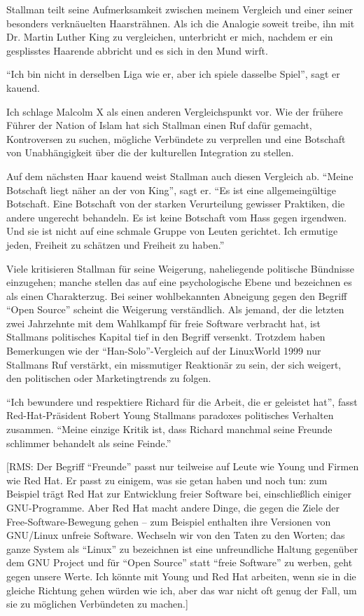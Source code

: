 Stallman teilt seine Aufmerksamkeit zwischen meinem Vergleich und einer seiner besonders verknäuelten Haarsträhnen. Als ich die Analogie soweit treibe, ihn mit Dr. Martin Luther King zu vergleichen, unterbricht er mich, nachdem er ein gesplisstes Haarende abbricht und es sich in den Mund wirft.

"`Ich bin nicht in derselben Liga wie er, aber ich spiele dasselbe Spiel"', sagt er kauend.

Ich schlage Malcolm X als einen anderen Vergleichspunkt vor. Wie der frühere Führer der Nation of Islam hat sich Stallman einen Ruf dafür gemacht, Kontroversen zu suchen, mögliche Verbündete zu verprellen und eine Botschaft von Unabhängigkeit über die der kulturellen Integration zu stellen.

Auf dem nächsten Haar kauend weist Stallman auch diesen Vergleich ab. "`Meine Botschaft liegt näher an der von King"', sagt er. "`Es ist eine allgemeingültige Botschaft. Eine Botschaft von der starken Verurteilung gewisser Praktiken, die andere ungerecht behandeln. Es ist keine Botschaft vom Hass gegen irgendwen. Und sie ist nicht auf eine schmale Gruppe von Leuten gerichtet. Ich ermutige jeden, Freiheit zu schätzen und Freiheit zu haben."'

Viele kritisieren Stallman für seine Weigerung, naheliegende politische Bündnisse einzugehen; manche stellen das auf eine psychologische Ebene und bezeichnen es als einen Charakterzug. Bei seiner wohlbekannten Abneigung gegen den Begriff "`Open Source"' scheint die Weigerung verständlich. Als jemand, der die letzten zwei Jahrzehnte mit dem Wahlkampf für freie Software verbracht hat, ist Stallmans politisches Kapital tief in den Begriff versenkt. Trotzdem haben Bemerkungen wie der "`Han-Solo"'-Vergleich auf der LinuxWorld 1999 nur Stallmans Ruf verstärkt, ein missmutiger Reaktionär zu sein, der sich weigert, den politischen oder Marketingtrends zu folgen.

"`Ich bewundere und respektiere Richard für die Arbeit, die er geleistet hat"', fasst Red-Hat-Präsident Robert Young Stallmans paradoxes politisches Verhalten zusammen. "`Meine einzige Kritik ist, dass Richard manchmal seine Freunde schlimmer behandelt als seine Feinde."'

[RMS: Der Begriff "`Freunde"' passt nur teilweise auf Leute wie Young und Firmen wie Red Hat. Er passt zu einigem, was sie getan haben und noch tun: zum Beispiel trägt Red Hat zur Entwicklung freier Software bei, einschließlich einiger GNU-Programme. Aber Red Hat macht andere Dinge, die gegen die Ziele der Free-Software-Bewegung gehen – zum Beispiel enthalten ihre Versionen von GNU/Linux unfreie Software. Wechseln wir von den Taten zu den Worten; das ganze System als "`Linux"' zu bezeichnen ist eine unfreundliche Haltung gegenüber dem GNU Project und für "`Open Source"' statt "`freie Software"' zu werben, geht gegen unsere Werte. Ich könnte mit Young und Red Hat arbeiten, wenn sie in die gleiche Richtung gehen würden wie ich, aber das war nicht oft genug der Fall, um sie zu möglichen Verbündeten zu machen.]

